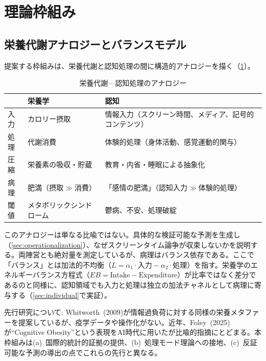 \documentclass[a4paper,11pt,titlepage]{article}
\newcommand{\balanceL}{L}
\begin{document}
\section{理論枠組み}\label{sec:theory}

\subsection{栄養代謝アナロジーとバランスモデル}\label{sec:analogy}

提案する枠組みは、栄養代謝と認知処理の間に構造的アナロジーを描く（\cref{tab:analogy}）。

\begin{table}[htbp]
\centering
\caption{栄養代謝---認知処理のアナロジー}
\label{tab:analogy}
\begin{tabular}{lll}
\toprule
 & 栄養学 & 認知 \\
\midrule
入力 & カロリー摂取 & 情報入力（スクリーン時間、メディア、記号的コンテンツ） \\
処理 & 代謝消費 & 体験的処理（身体活動、感覚運動的関与） \\
圧縮 & 栄養素の吸収・貯蔵 & 教育・内省・睡眠による抽象化 \\
病理 & 肥満（摂取$\gg$消費） & 「感情の肥満」（認知入力$\gg$体験的処理） \\
閾値 & メタボリックシンドローム & 鬱病、不安、処理破綻 \\
\bottomrule
\end{tabular}
\end{table}

このアナロジーは単なる比喩ではない。具体的な検証可能な予測を生成し（\cref{sec:operationalization}）、なぜスクリーンタイム論争が収束しないかを説明する。両陣営とも絶対量を測定しているが、病理はバランス依存である。ここで「バランス」とは加法的不均衡（$\balanceL = \alpha_1 \cdot \text{入力} - \alpha_2 \cdot \text{処理}$）を指す。栄養学のエネルギーバランス方程式（$EB = \text{Intake} - \text{Expenditure}$）が比率ではなく差分であるのと同様に、認知領域でも入力と処理は独立の加法チャネルとして病理に寄与する（\cref{sec:individual}で実証）。

先行研究について: Whitworth~(2009)が情報過負荷に対する同様の栄養メタファーを提案しているが、疫学データや操作化がない。近年、Foley~(2025)が``Cognitive Obesity''という表現をAI時代に用いたが比喩的指摘にとどまる。本枠組みは(a)~国際的統計的証拠の提供、(b)~処理モード理論への接地、(c)~反証可能な予測の導出の点でこれらの先行と異なる。
\end{document}
